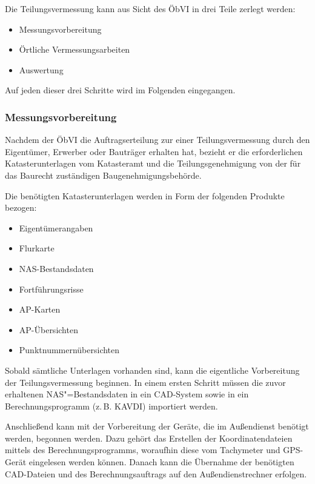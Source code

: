 Die Teilungsvermessung kann aus Sicht des \ac{ÖbVI} in drei Teile zerlegt werden:
\begin{itemize}
	\item Messungsvorbereitung
	\item Örtliche Vermessungsarbeiten
	\item Auswertung
\end{itemize}

Auf jeden dieser drei Schritte wird im Folgenden eingegangen.

\subsubsection{Messungsvorbereitung}

Nachdem der \ac{ÖbVI} die Auftragserteilung zur einer Teilungsvermessung durch den Eigentümer, Erwerber oder Bauträger erhalten hat, bezieht er die erforderlichen Katasterunterlagen vom Katasteramt und die Teilungsgenehmigung von der für das Baurecht zuständigen Baugenehmigungsbehörde.

Die benötigten Katasterunterlagen werden in Form der folgenden Produkte bezogen:
\begin{itemize}
	\item Eigentümerangaben
	\item Flurkarte
	\item NAS-Bestandsdaten
	\item Fortführungsrisse
	\item AP-Karten
	\item AP-Übersichten
	\item Punktnummernübersichten
\end{itemize}
Sobald sämtliche Unterlagen vorhanden sind, kann die eigentliche Vorbereitung der Teilungsvermessung beginnen.
In einem ersten Schritt müssen die zuvor erhaltenen NAS"=Bestandsdaten in ein CAD-System sowie in ein Berechnungsprogramm (z.\,B. KAVDI) importiert werden.

Anschließend kann mit der Vorbereitung der Geräte, die im Außendienst benötigt werden, begonnen werden.
Dazu gehört das Erstellen der Koordinatendateien mittels des Berechnungsprogramms, woraufhin diese vom Tachymeter und GPS-Gerät eingelesen werden können. Danach kann die Übernahme der benötigten CAD-Dateien und des Berechnungsauftrags auf den Außendienstrechner erfolgen.

